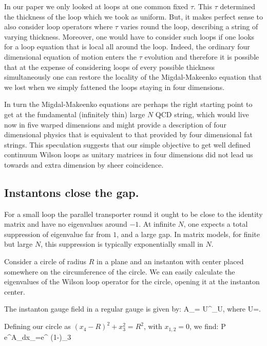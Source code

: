 In our paper we only looked at loops at one common fixed $\tau$.
This $\tau$ determined the thickness of the loop which we took as
uniform. But, it makes perfect sense to also consider loop
operators where $\tau$ varies round the loop, describing a string
of varying thickness. Moreover, one would have to consider such
loops if one looks for a loop equation that is local all around
the loop. Indeed, the ordinary four dimensional equation of motion
enters the $\tau$ evolution and therefore it is possible that at
the expense of considering loops of every
possible thickness simultaneously one can
restore the locality of the Migdal-Makeenko equation that we lost
when we simply fattened the loops staying in four dimensions.

In turn the Migdal-Makeenko equations are perhaps the right
starting point to get at the fundamental (infinitely thin) large
$N$ QCD string, which would live now in five warped dimensions and
might provide a description of four dimensional physics that is
equivalent to that provided by four dimensional fat strings. This
speculation suggests
that our simple objective to
get well defined continuum Wilson loops as unitary matrices in
four dimensions
did not lead us towards and extra dimension
by sheer coincidence.


\subsection{Instantons close the gap.}

For a small loop the parallel transporter round it ought to be
close to the identity matrix and have no eigenvalues around $-1$.
At infinite $N$, one expects a total suppression of eigenvalue far
from $1$, and a large gap. In matrix models, for finite but large
$N$, this suppression is typically exponentially small in $N$.

Consider a circle of radius $R$ in a plane and an instanton
with center placed somewhere on the circumference of the circle.
We can easily calculate the eigenvalues of the Wilson loop
operator for the circle, opening it at the instanton center.

The instanton gauge field in a regular gauge is given by:
\be
A_\mu=\imath{} U^\dagger \partial_\mu U,
\ee
where
\be
U=.
\ee

Defining our circle as $(x_4-R)^2+x_3^2=R^2$, with $x_{1,2}=0$, we find:
\be
{\cal P} e^{\imath\oint A_\mu dx_\mu}=e^{\imath\pi
(1-)\sigma_3 }  \ee



